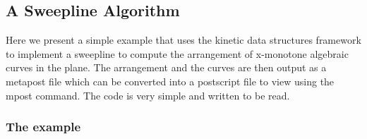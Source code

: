 

\subsection{A Sweepline Algorithm}
\label{sec:sweepline_example}

Here we present a simple example that uses the kinetic data structures
framework to implement a sweepline to compute the arrangement of
x-monotone algebraic curves in the plane. The arrangement and the
curves are then output as a metapost file which can be converted into
a postscript file to view using the mpost command. The code is very
simple and written to be read.

\subsubsection{The example}

\label{fig:sweepline_program}

